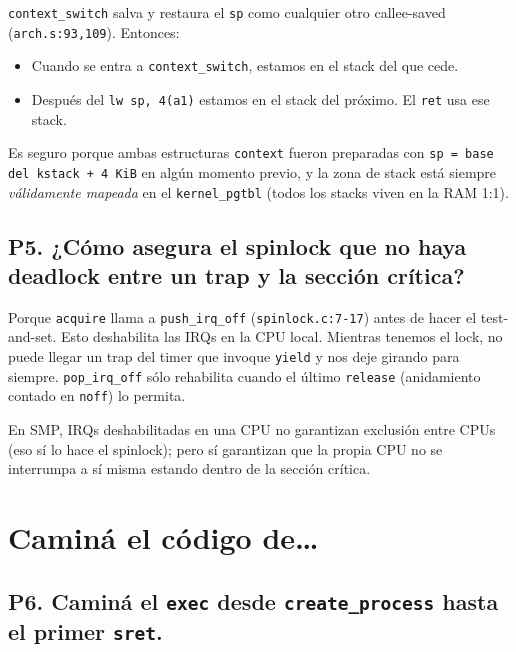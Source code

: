 \documentclass[11pt,a4paper]{article}
\begin{document}
\begin{respuesta}
\texttt{context\_switch} salva y restaura el \texttt{sp} como
cualquier otro callee-saved (\texttt{arch.s:93,109}). Entonces:

\begin{itemize}[leftmargin=*,nosep]
    \item Cuando se entra a \texttt{context\_switch}, estamos en el
        stack del que cede.
    \item Después del \texttt{lw sp, 4(a1)} estamos en el stack del
        próximo. El \texttt{ret} usa ese stack.
\end{itemize}

Es seguro porque ambas estructuras \texttt{context} fueron
preparadas con \texttt{sp = base del kstack + 4\,KiB} en algún
momento previo, y la zona de stack está siempre \emph{válidamente
mapeada} en el \texttt{kernel\_pgtbl} (todos los stacks viven en la
RAM 1:1).
\end{respuesta}

\subsection*{P5. ¿Cómo asegura el spinlock que no haya deadlock entre un trap y la sección crítica?}

\begin{respuesta}
Porque \texttt{acquire} llama a \texttt{push\_irq\_off}
(\texttt{spinlock.c:7-17}) antes de hacer el test-and-set. Esto
deshabilita las IRQs en la CPU local. Mientras tenemos el lock, no
puede llegar un trap del timer que invoque \texttt{yield} y nos
deje girando para siempre. \texttt{pop\_irq\_off} sólo rehabilita
cuando el último \texttt{release} (anidamiento contado en
\texttt{noff}) lo permita.

En SMP, IRQs deshabilitadas en una CPU no garantizan exclusión
entre CPUs (eso sí lo hace el spinlock); pero sí garantizan que la
propia CPU no se interrumpa a sí misma estando dentro de la
sección crítica.
\end{respuesta}

\section{Caminá el código de…}

\subsection*{P6. Caminá el \texttt{exec} desde \texttt{create\_process} hasta el primer \texttt{sret}.}
\end{document}
